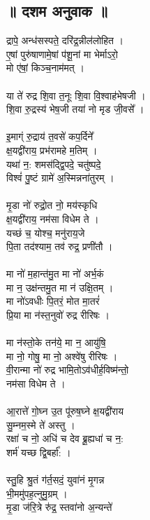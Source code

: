 \subsection{॥ दशम अनुवाक ॥}
द्रापे॒ अन्ध॑सस्पते॒ दरि॑द्र॒न्नील॑लोहित ।\\
ए॒षां पुरु॑षाणामे॒षां प॑शू॒नां मा भेर्माऽरो॒\\
मो ए॑षां॒ किञ्च॒नाम॑मत् ।\\
\\
या ते॑ रुद्र शि॒वा त॒नूः शि॒वा वि॒श्वाह॑भेषजी ।\\
शि॒वा रु॒द्रस्य॑ भेष॒जी तया॑ नो मृड जी॒वसे᳚ ।\\
\\
इ॒माग्ं रु॒द्राय॑ त॒वसे॑ कप॒र्दिने᳚\\
क्ष॒यद्वी॑राय॒ प्रभ॑रामहे म॒तिम् ।\\
यथा॑ न॒: शमस॑द्द्वि॒पदे॒ चतु॑ष्पदे॒\\
विश्वं॑ पु॒ष्टं ग्रामे॑ अ॒स्मिन्नना॑तुरम् ।\\
\\
मृ॒डा नो॑ रुद्रो॒त नो॒ मय॑स्कृधि\\
क्ष॒यद्वी॑राय॒ नम॑सा विधेम ते ।\\
यच्छं च॒ योश्च॒ मनु॑राय॒जे\\
पि॒ता तद॑श्याम॒ तव॑ रुद्र॒ प्रणी॑तौ ।\\
\\
मा नो॑ म॒हान्त॑मु॒त मा नो॑ अर्भ॒कं\\
मा न॒ उक्ष॑न्तमु॒त मा न॑ उक्षि॒तम् ।\\
मा नो॑ऽवधीः पि॒तरं॒ मोत मा॒तरं॑\\
प्रि॒या मा न॑स्त॒नुवो॑ रुद्र रीरिषः ।\\
\\
मा न॑स्तो॒के तन॑ये॒ मा न॒ आयु॑षि॒\\
मा नो॒ गोषु॒ मा नो॒ अश्वे॑षु रीरिषः ।\\
वी॒रान्मा नो॑ रुद्र भामि॒तोऽव॑धीर्ह॒विष्म॑न्तो॒\\
नम॑सा विधेम ते ।\\
\\
आ॒रात्ते॑ गो॒घ्न उ॒त पू॑रुष॒घ्ने क्ष॒यद्वी॑राय\\
सु॒म्नम॒स्मे ते॑ अस्तु ।\\
रक्षा॑ च नो॒ अधि॑ च देव ब्रू॒ह्यधा॑ च न॒:\\
शर्म॑ यच्छ द्वि॒बर्हा᳚: ।\\
\\
स्तु॒हि श्रु॒तं ग॑र्त॒सदं॒ युवा॑नं मृ॒गन्न\\
भी॒ममु॑पह॒त्नुमु॒ग्रम् ।\\
मृ॒डा ज॑रि॒त्रे रु॑द्र॒ स्तवा॑नो अ॒न्यन्ते॑\\
